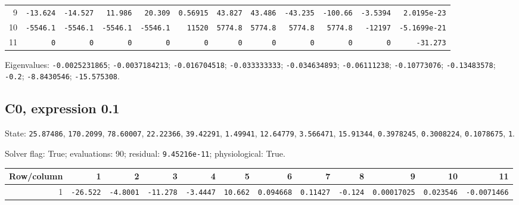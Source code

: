 \begin{landscape}
\begin{tabular}{rrrrrrrrrrrr}
9 & \texttt{-13.624} & \texttt{-14.527} & \texttt{11.986} & \texttt{20.309} & \texttt{0.56915} & \texttt{43.827} & \texttt{43.486} & \texttt{-43.235} & \texttt{-100.66} & \texttt{-3.5394} & \texttt{2.0195e-23} \\

10 & \texttt{-5546.1} & \texttt{-5546.1} & \texttt{-5546.1} & \texttt{-5546.1} & \texttt{11520} & \texttt{5774.8} & \texttt{5774.8} & \texttt{5774.8} & \texttt{5774.8} & \texttt{-12197} & \texttt{-5.1699e-21} \\

11 & \texttt{0} & \texttt{0} & \texttt{0} & \texttt{0} & \texttt{0} & \texttt{0} & \texttt{0} & \texttt{0} & \texttt{0} & \texttt{0} & \texttt{-31.273} \\

\bottomrule\end{tabular}\par\endgroup

{\scriptsize Eigenvalues: \texttt{-0.0025231865}; \texttt{-0.0037184213}; \texttt{-0.016704518}; \texttt{-0.033333333}; \texttt{-0.034634893}; \texttt{-0.06111238}; \texttt{-0.10773076}; \texttt{-0.13483578}; \texttt{-0.2}; \texttt{-8.8430546}; \texttt{-15.575308}.\par}

\subsection*{C0, expression 0.1}
{\scriptsize State: \texttt{25.87486}, \texttt{170.2099}, \texttt{78.60007}, \texttt{22.22366}, \texttt{39.42291}, \texttt{1.49941}, \texttt{12.64779}, \texttt{3.566471}, \texttt{15.91344}, \texttt{0.3978245}, \texttt{0.3008224}, \texttt{0.1078675}, \texttt{1}.\par

Solver flag: True; evaluations: 90; residual: \texttt{9.45216e-11}; physiological: True.\par}

\begingroup\scriptsize\setlength{\tabcolsep}{3pt}\centering
\begin{tabular}{rrrrrrrrrrrr}\toprule

Row/column & 1 & 2 & 3 & 4 & 5 & 6 & 7 & 8 & 9 & 10 & 11 \\ \midrule

1 & \texttt{-26.522} & \texttt{-4.8001} & \texttt{-11.278} & \texttt{-3.4447} & \texttt{10.662} & \texttt{0.094668} & \texttt{0.11427} & \texttt{-0.124} & \texttt{0.00017025} & \texttt{0.023546} & \texttt{-0.0071466} \\


\end{tabular}
\end{landscape}
